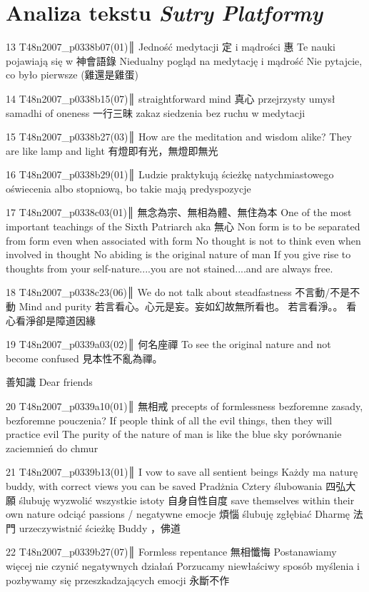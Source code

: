 \chapter{Analiza tekstu \textit{Sutry Platformy}}

13 T48n2007_p0338b07(01)║
Jedność medytacji 定 i mądrości 惠
Te nauki pojawiają się w 神會語錄
Niedualny pogląd na medytację i mądrość
Nie pytajcie, co było pierwsze (雞還是雞蛋)

14 T48n2007_p0338b15(07)║
straightforward mind 真心 przejrzysty umysł
samadhi of oneness 一行三昧
zakaz siedzenia bez ruchu w medytacji

15 T48n2007_p0338b27(03)║
How are the meditation and wisdom alike?
They are like lamp and light
有燈即有光，無燈即無光

16 T48n2007_p0338b29(01)║
Ludzie praktykują ścieżkę natychmiastowego oświecenia albo stopniową, bo takie mają predyspozycje

17 T48n2007_p0338c03(01)║
無念為宗、無相為體、無住為本
One of the most important teachings of the Sixth Patriarch
aka 無心
Non form is to be separated from form even when associated with form
No thought is not to think even when involved in thought
No abiding is the original nature of man
If you give rise to thoughts from your self-nature....you are not stained....and are always free.

18 T48n2007_p0338c23(06)║
We do not talk about steadfastness 不言動/不是不動
Mind and purity
若言看心。心元是妄。妄如幻故無所看也。
若言看淨。。
看心看淨卻是障道因緣

19 T48n2007_p0339a03(02)║
何名座禪
To see the original nature and not become confused
見本性不亂為禪。

善知識 Dear friends

20 T48n2007_p0339a10(01)║
無相戒 precepts of formlessness bezforemne zasady, bezforemne pouczenia?
If people think of all the evil things, then they will practice evil
The purity of the nature of man is like the blue sky
porównanie zaciemnień do chmur

21 T48n2007_p0339b13(01)║
I vow to save all sentient beings
Każdy ma naturę buddy, with correct views you can be saved
Pradżnia
Cztery ślubowania 四弘大願
ślubuję wyzwolić wszystkie istoty
自身自性自度 save themselves within their own nature
odciąć passions / negatywne emocje 煩惱
ślubuję zgłębiać Dharmę 法門
urzeczywistnić ścieżkę Buddy ，佛道

22 T48n2007_p0339b27(07)║
Formless repentance 無相懺悔
Postanawiamy więcej nie czynić negatywnych działań
Porzucamy niewłaściwy sposób myślenia i pozbywamy się przeszkadzających emocji
永斷不作

